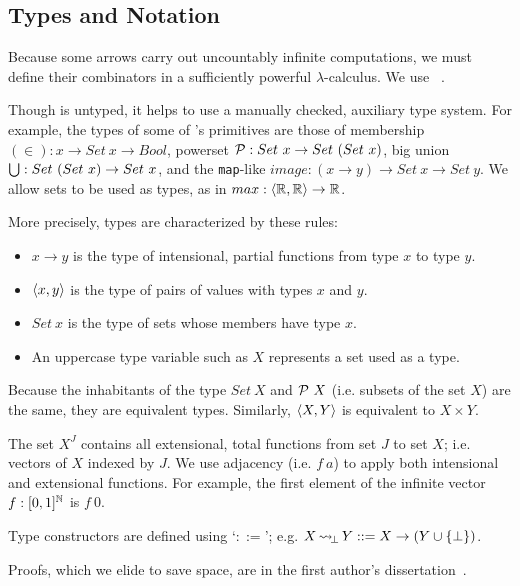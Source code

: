 \documentclass{llncs}
\newcommand{\arrow}{\rightsquigarrow}
\DeclareMathOperator{\botto}{{\arrow\mspace{-3mu}}_\bot}
\begin{document}
\subsection{Types and Notation}

Because some arrows carry out uncountably infinite computations, we must define their combinators in a sufficiently powerful $\lambda$-calculus.
We use \lzfclang~\cite{cit:toronto-2012flops-lzfc}.

Though \lzfclang is untyped, it helps to use a manually checked, auxiliary type system.
For example, the types of some of \lzfclang's primitives are those of membership $(\in) : x \to Set~x \to Bool$, powerset $\mathcal{P} : Set~x \to Set~(Set~x)$, big union $\textstyle\bigcup : Set~(Set~x) \to Set~x$, and the \texttt{map}-like $image : (x \to y) \to Set~x \to Set~y$.
We allow sets to be used as types, as in $max : \langle{\mathbb{R},\mathbb{R}}\rangle \to \mathbb{R}$.

More precisely, types are characterized by these rules:
\begin{itemize}
	\item $x \to y$ is the type of intensional, partial functions from type $x$ to type $y$.
	\item $\langle{x,y}\rangle$ is the type of pairs of values with types $x$ and $y$.
	\item $Set~x$ is the type of sets whose members have type $x$.
	\item An uppercase type variable such as $X$ represents a set used as a type.
\end{itemize}
Because the inhabitants of the type $Set~X$ and $\mathcal{P}~X$ (i.e. subsets of the set $X$) are the same, they are equivalent types.
Similarly, $\langle{X,Y}\rangle$ is equivalent to $X \times Y$.

The set $X^J$ contains all extensional, total functions from set $J$ to set $X$; i.e. vectors of $X$ indexed by $J$.
We use adjacency (i.e. $f~a$) to apply both intensional and extensional functions.
For example, the first element of the infinite vector $f : [0,1]^{\mathbb{N}}$ is $f~0$.

Type constructors are defined using `$::=$'; e.g. $X \botto Y ::= X \to (Y \u \set{\bot})$.

Proofs, which we elide to save space, are in the first author's dissertation~\cite{cit:toronto-thesis}.

\end{document}
